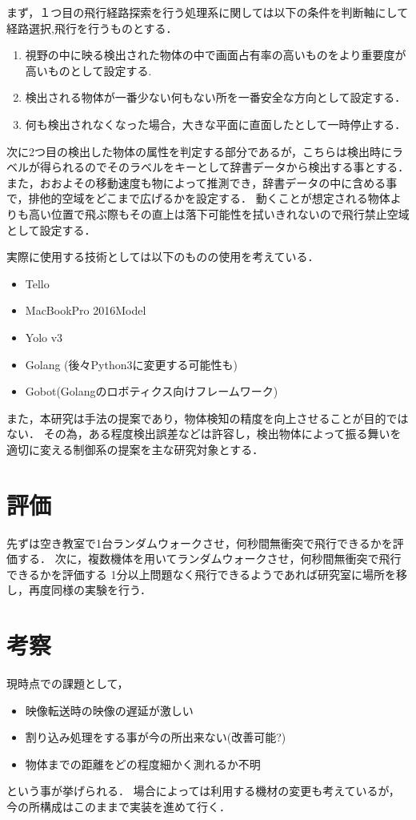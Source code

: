 \documentclass[a4j,10pt]{jsarticle}
\begin{document}
まず，１つ目の飛行経路探索を行う処理系に関しては以下の条件を判断軸にして経路選択,飛行を行うものとする．

\begin{enumerate}
\item 視野の中に映る検出された物体の中で画面占有率の高いものをより重要度が高いものとして設定する.
\item 検出される物体が一番少ない何もない所を一番安全な方向として設定する．
\item 何も検出されなくなった場合，大きな平面に直面したとして一時停止する．
\end{enumerate}

次に2つ目の検出した物体の属性を判定する部分であるが，こちらは検出時にラベルが得られるのでそのラベルをキーとして辞書データから検出する事とする．
また，おおよその移動速度も物によって推測でき，辞書データの中に含める事で，排他的空域をどこまで広げるかを設定する．
動くことが想定される物体よりも高い位置で飛ぶ際もその直上は落下可能性を拭いきれないので飛行禁止空域として設定する．

実際に使用する技術としては以下のものの使用を考えている．
\begin{itemize}
\item Tello
\item MacBookPro 2016Model
\item Yolo v3
\item Golang (後々Python3に変更する可能性も)
\item Gobot(Golangのロボティクス向けフレームワーク)
\end{itemize}

また，本研究は手法の提案であり，物体検知の精度を向上させることが目的ではない．
その為，ある程度検出誤差などは許容し，検出物体によって振る舞いを適切に変える制御系の提案を主な研究対象とする．


\section{評価}
先ずは空き教室で1台ランダムウォークさせ，何秒間無衝突で飛行できるかを評価する．
次に，複数機体を用いてランダムウォークさせ，何秒間無衝突で飛行できるかを評価する
1分以上問題なく飛行できるようであれば研究室に場所を移し，再度同様の実験を行う．

\section{考察}
現時点での課題として，
\begin{itemize}
\item 映像転送時の映像の遅延が激しい
\item 割り込み処理をする事が今の所出来ない(改善可能?) 
\item 物体までの距離をどの程度細かく測れるか不明
\end{itemize}
という事が挙げられる．
場合によっては利用する機材の変更も考えているが，今の所構成はこのままで実装を進めて行く．
\end{document}
